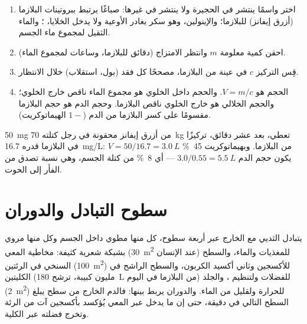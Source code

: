 \begin{method}\label{met:b1:mammal-organization:dilution}
\begin{enumerate}
  \item اختر واسمًا ينتشر في الحجيرة ولا ينتشر في غيرها: صباغًا
        يرتبط ببروتينات البلازما (أزرق إيفانز) للبلازما؛ والإينولين،
        وهو سكر يغادر الأوعية ولا يدخل الخلايا، ؛
        والماء الثقيل لمجموع ماء الجسم.
  \item احقن كمية معلومة $m$ وانتظر الامتزاج (دقائق للبلازما، وساعات
        لمجموع الماء).
  \item قِس التركيز $c$ في عينة من البلازما، مصححًا كل فقد (بول،
        استقلاب) خلال الانتظار.
  \item الحجم هو $V = m/c$. والحجم داخل الخلوي هو مجموع الماء ناقص
        خارج الخلوي؛ والحجم الخلالي هو خارج الخلوي ناقص البلازما.
        وحجم الدم هو حجم البلازما مقسومًا على كسر البلازما من الدم
        ($1 - $ الهيماتوكريت).
\end{enumerate}
\end{method}

\begin{example}\label{ex:b1:mammal-organization:evansblue}
\qty{50}{mg} من أزرق إيفانز محقونة في رجل كتلته \qty{70}{kg} تعطي،
بعد عشر دقائق، تركيزًا في البلازما قدره \qty{16.7}{mg/L}:
$V = 50/16.7 = \qty{3.0}{L}$ من البلازما. وبهيماتوكريت
\qty{45}{\%} يكون حجم الدم $3.0/0.55 = \qty{5.5}{L}$ --- أي
\qty{8}{\%} من كتلة الجسم، وهي نسبة تصدق من الفأر إلى الحوت.
\end{example}

\section{سطوح التبادل والدوران}

\begin{proposition}\label{prop:b1:mammal-organization:surfaces}
يتبادل الثديي مع الخارج عبر أربعة سطوح، كل منها مطوي داخل الجسم
وكل منها مروي بشبكة شعرية كثيفة: مخاطية المعي (\qty{30}{m^2} عند
الإنسان) للمغذيات والماء، والسطح السنخي في الرئتين (\qty{100}{m^2})
للأكسجين وثاني أكسيد الكربون، والسطح الراشح في الكليتين (مليون
كبيبة، ترشح \qty{180}{L} من البلازما في اليوم) للفضلات ولتنظيم ، والجلد (\qty{2}{m^2}) للحرارة ولقليل من الماء. والدوران
يربط بينها: فالدم الخارج من سطح يبلغ السطح التالي في دقيقة، حتى إن
ما يدخل عبر المعي يُؤكسد بأكسجين آت من الرئة وتخرج فضلته عبر
الكلية.
\end{proposition}

